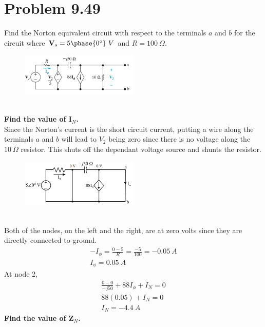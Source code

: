 \documentclass[12pt]{article}
\begin{document}
    \section*{Problem 9.49}
    Find the Norton equivalent circuit with respect to the terminals $a$ and $b$
    for the circuit where $\textbf{V}_{s} = 5 \phase{0^{\circ}}\ V$ and $R =
    100\ \Omega$.
    \begin{figure}[h]
        \centering
        \includegraphics[width=0.5\textwidth]{9.49 Circuit.png}
    \end{figure}
    \\
    \textbf{Find the value of I$_{N}$.} \\
    Since the Norton's current is the short circuit current, putting a wire
    along the terminals $a$ and $b$ will lead to $V_2$ being zero since there is
    no voltage along the $10\ \Omega$ resistor. This shuts off the dependant
    voltage source and shunts the resistor.
    \begin{figure}[h]
        \centering
        \includegraphics[width=0.5\textwidth]{9.49 Simplified Circuit.png}
    \end{figure}
    \\
    \noindent Both of the nodes, on the left and the right, are at zero volts
    since they are directly connected to ground.
    \begin{gather*}
        -I_{\phi} = \frac{0-5}{R} = \frac{-5}{100} = -0.05\ A \\
        I_{\phi} = 0.05\ A
    \end{gather*}
    At node 2,
    \begin{gather*}
        \frac{0-0}{-j 50} + 88 I_{\phi} + I_{N} = 0 \\
        88(0.05) + I_N = 0 \\
        \boxed{I_N = -4.4\ A}
    \end{gather*}
    \textbf{Find the value of Z$_{N}$.} \\
\end{document}

